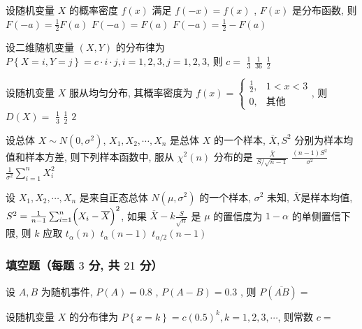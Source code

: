\begin{ti}
	设随机变量 $X$ 的概率密度 $f(x)$ 满足 $f(-x)=f(x)$ , $F(x)$ 是分布函数, 则 \kuoA{}
	{$F(-a)=\frac{1}{2}F(a)$}
	{$F(-a)=F(a)$}
	{$F(-a)=\frac{1}{2}-F(a)$}
\end{ti}

\begin{ti}
	设二维随机变量 $(X,Y)$ 的分布律为 $P\left\{X=i,Y=j\right\}=c\cdot i\cdot j,i=1,2,3,j=1,2,3$, 则 $c=$ \kuoC{}
	{$\frac{1}{3}$}
	{$\frac{1}{36}$}
	{$\frac{1}{2}$}
\end{ti}

\begin{ti}
	设随机变量 $X$ 服从均匀分布, 其概率密度为 $f(x)=
	\begin{cases}
	\frac{1}{2}, & 1<x<3\\
	0, & \text{其他}
	\end{cases}
	$, 则 $D(X)=$ \kuoB{}
	{$\frac{1}{3}$}
	{$\frac{1}{2}$}
	{$2$}
\end{ti}

\begin{ti}
	设总体 $X\sim N\left(0,\sigma^2\right)$, $X_1,X_2,\cdots,X_n$ 是总体 $X$ 的一个样本, $\overline{X},S^2$ 分别为样本均值和样本方差, 则下列样本函数中, 服从 $\chi^2(n)$ 分布的是 \kuoD{}
	{$\frac{\overline{X}}{S/\sqrt{n-1}}$}
	{$\frac{(n-1)S^2}{\sigma^2}$}
	{$\frac{1}{\sigma^2}\sum_{i=1}^{n}X_i^2$}
\end{ti}

\begin{ti}
	设 $X_1,X_2,\cdots,X_n$ 是来自正态总体 $N\left(\mu,\sigma^2\right)$ 的一个样本, $\sigma^2$ 未知, $\overline{X}$是样本均值, $S^2=\frac{1}{n-1}\sum_{i=1}^{n}\Bigl(X_i-\overline{X}\Bigr)^2$, 如果 $\overline{X}-k\frac{S}{\sqrt{n}}$ 是 $\mu$ 的置信度为 $1-\alpha$ 的单侧置信下限, 则 $k$ 应取 \kuoC{}
	{$t_{\alpha}(n)$}
	{$t_{\alpha}(n-1)$}
	{$t_{\alpha/2}(n-1)$}
\end{ti}

\subsubsection{填空题（每题 $3$ 分, 共 $21$ 分）}
\begin{ti}
	设 $A,B$ 为随机事件, $P(A)=0.8$ , $P(A-B)=0.3$ , 则 $P\left(\overline{AB}\right)=$ 
\end{ti}

\begin{ti}
	设随机变量 $X$ 的分布律为 $P\left\{x=k\right\}=c(0.5)^k,k=1,2,3,\cdots$, 则常数 $c=$ 
\end{ti}


